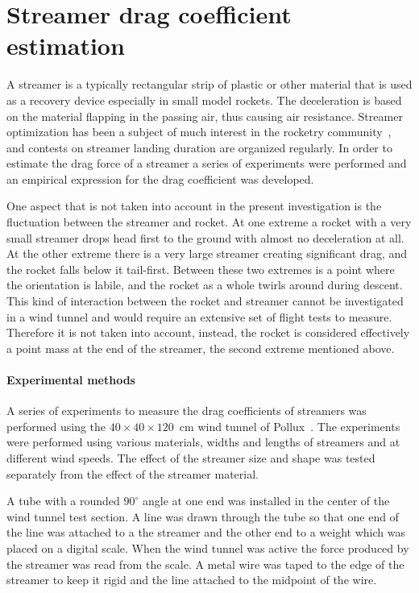 \chapter{Streamer drag coefficient estimation}
\label{app-streamers}


A streamer is a typically rectangular strip of plastic or other
material that is used as a recovery device especially in small model
rockets.  The deceleration is based on the material flapping in the
passing air, thus causing air resistance.  Streamer optimization has
been a subject of much interest in the rocketry
community~\cite{streamer-optimization}, and contests on streamer
landing duration are organized regularly.  In order to estimate the
drag force of a streamer a series of experiments were performed and an
empirical expression for the drag coefficient was developed.

One aspect that is not taken into account in the present investigation
is the fluctuation between the streamer and rocket.  At one extreme a
rocket with a very small streamer drops head first to the ground with
almost no deceleration at all.  At the other extreme there is a very
large streamer creating significant drag, and the rocket falls below
it tail-first.  Between these two extremes is a point where the
orientation is labile, and the rocket as a whole twirls
around during descent.  This kind of interaction between the rocket
and streamer cannot be investigated in a wind tunnel and would require
an extensive set of flight tests to measure.  Therefore it is not
taken into account, instead, the rocket is considered effectively a
point mass at the end of the streamer, the second extreme mentioned
above.


\subsubsection*{Experimental methods}

A series of experiments to measure the drag coefficients of streamers
was performed using the $40\times40\times120$~cm wind tunnel of
Pollux~\cite{pollux-wind-tunnel}.  The experiments were performed
using various materials, widths and lengths of streamers and at
different wind speeds.  The effect of the streamer size and shape was
tested separately from the effect of the streamer material.

A tube with a rounded $90^\circ$ angle at one end was installed in the
center of the wind tunnel test section.  A line was drawn through the
tube so that one end of the line was attached to a the streamer and the
other end to a weight which was placed on a digital scale.  When the
wind tunnel was active the force produced by the streamer was read
from the scale.  A metal wire was taped to the edge of the streamer to
keep it rigid and the line attached to the midpoint of the wire.

